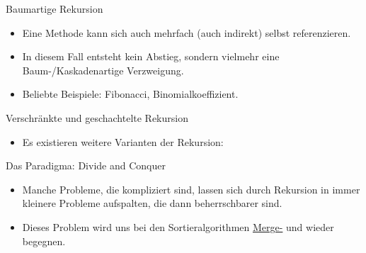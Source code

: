 \begin{frame}[fragile]{Baumartige Rekursion}
    \begin{itemize}[<+(1)->]
        \widei
        \item Eine Methode kann sich auch mehrfach (auch indirekt) selbst referenzieren.
        \item In diesem Fall entsteht kein  Abstieg,\pause{} sondern vielmehr eine Baum-/Kaskadenartige Verzweigung.
        \item Beliebte Beispiele: Fibonacci, Binomialkoeffizient.
    \end{itemize}
    \vfill\hbox{}
\end{frame}


\begin{frame}[fragile]{Verschränkte und geschachtelte Rekursion}
    \begin{itemize}[<+(1)->]
        \widei
        \item Es existieren weitere Varianten der Rekursion: 
    \end{itemize}
\end{frame}

\begin{frame}{Das Paradigma: Divide and Conquer}
    \begin{itemize}[<+(1)->]
        \widei
        \item Manche Probleme, die kompliziert sind,\pause{} lassen sich durch Rekursion in immer kleinere Probleme aufspalten, die dann beherrschbarer sind.
        \item Dieses Problem wird uns bei den Sortieralgorithmen \hyperlink{mrk:sort-Mergesort}{Merge-} und  wieder begegnen.
    \end{itemize}
\end{frame}

